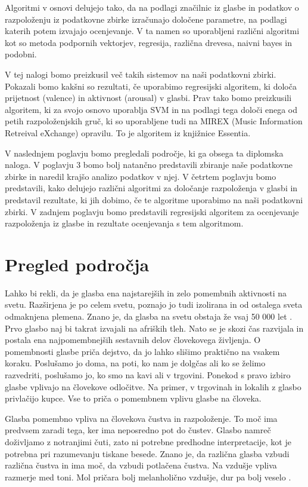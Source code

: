 \documentclass[a4paper, 12pt]{book}
\begin{document}
{Algoritmi v osnovi delujejo tako, da na podlagi značilnic iz glasbe in podatkov o razpoloženju iz podatkovne zbirke izračunajo določene parametre, na podlagi katerih potem izvajajo ocenjevanje. V ta namen so uporabljeni različni algoritmi kot so metoda podpornih vektorjev, regresija, različna drevesa, naivni bayes in podobni. 

V tej nalogi bomo preizkusil več takih sistemov na naši podatkovni zbirki. Pokazali bomo kakšni so rezultati, če uporabimo regresijski algoritem, ki določa prijetnost (valence) in aktivnost (arousal) v glasbi. Prav tako bomo preizkusili algoritem, ki za svojo osnovo uporablja SVM in na podlagi tega določi enega od petih razpoloženjskih gruč, ki so uporabljene tudi na MIREX (Music Information Retreival eXchange) opravilu. To je algoritem iz knjižnice Essentia.

V naslednjem poglavju bomo pregledali področje, ki ga obsega ta diplomska naloga. V poglavju 3 bomo bolj natančno predstavili zbiranje naše podatkovne zbirke in naredil krajšo analizo podatkov v njej. V četrtem poglavju bomo predstavili, kako delujejo različni algoritmi za določanje razpoloženja v glasbi in predstavil rezultate, ki jih dobimo, če te algoritme uporabimo na naši podatkovni zbirki. V zadnjem poglavju bomo predstavili regresijski algoritem za ocenjevanje razpoloženja iz glasbe in rezultate ocenjevanja s tem algoritmom.

\chapter{Pregled področja}

Lahko bi rekli, da je glasba ena najstarejših in zelo pomembnih aktivnosti na svetu. Razširjena je po celem svetu, poznajo jo tudi izolirana in od ostalega sveta odmaknjena plemena. Znano je, da glasba na svetu obstaja že vsaj 50 000 let \cite{Krause2012}. Prvo glasbo naj bi takrat izvajali na afriških tleh. Nato se je skozi čas razvijala in postala ena najpomembnejših sestavnih delov človekovega življenja. O pomembnosti glasbe priča dejstvo, da jo lahko slišimo praktično na vsakem koraku. Poslušamo jo doma, na poti, ko nam je dolgčas ali ko se želimo razvedriti, poslušamo jo, ko smo na kavi ali v trgovini. Ponekod s pravo izbiro glasbe vplivajo na človekove odločitve. Na primer, v trgovinah in lokalih z glasbo privlačijo kupce. Vse to priča o pomembnem vplivu glasbe na človeka.  

Glasba pomembno vpliva na človekova čustva in razpoloženje. To moč ima predvsem zaradi tega, ker ima neposredno pot do čustev. Glasbo namreč do\-živ\-lja\-mo z notranjimi čuti, zato ni potrebne predhodne interpretacije, kot je potrebna pri razumevanju tiskane besede.  Znano je, da različna glasba vzbudi različna čustva in ima moč, da vzbudi potlačena čustva. Na vzdušje vpliva razmerje med toni. Mol pričara bolj melanholično vzdušje, dur pa bolj veselo \cite{lenko2009pomen}.

}
\end{document}
